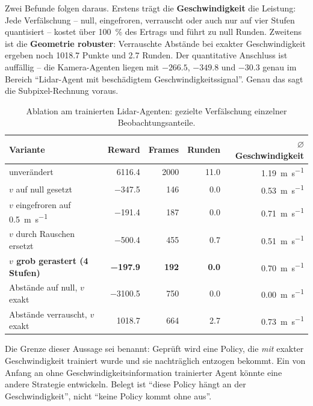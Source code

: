 Zwei Befunde folgen daraus. Erstens trägt die \textbf{Geschwindigkeit} die Leistung: Jede Verfälschung -- null, eingefroren, verrauscht oder auch nur auf vier Stufen quantisiert -- kostet über \SI{100}{\percent} des Ertrags und führt zu null Runden. Zweitens ist die \textbf{Geometrie robuster}: Verrauschte Abstände bei exakter Geschwindigkeit ergeben noch \num{1018.7} Punkte und \num{2.7} Runden. Der quantitative Anschluss ist auffällig -- die Kamera-Agenten liegen mit $-266.5$, $-349.8$ und $-30.3$ genau im Bereich \enquote{Lidar-Agent mit beschädigtem Geschwindigkeitssignal}. Genau das sagt die Subpixel-Rechnung voraus.

\begin{table}[htbp]
  \centering
  \caption{Ablation am trainierten Lidar-Agenten: gezielte Verfälschung einzelner Beobachtungsanteile.}
  \label{tab:ablation}
  \small
  \begin{tabular}{@{}l r r r r@{}}
    \toprule
    \textbf{Variante} & \textbf{Reward} & \textbf{Frames} & \textbf{Runden} & \textbf{$\varnothing$ Geschwindigkeit} \\
    \midrule
    unverändert                          & \num{6116.4}  & \num{2000} & \num{11.0} & \SI{1.19}{\meter\per\second} \\
    $v$ auf null gesetzt                 & \num{-347.5}  & \num{146}  & \num{0.0}  & \SI{0.53}{\meter\per\second} \\
    $v$ eingefroren auf \SI{0.5}{\meter\per\second} & \num{-191.4} & \num{187} & \num{0.0} & \SI{0.71}{\meter\per\second} \\
    $v$ durch Rauschen ersetzt           & \num{-500.4}  & \num{455}  & \num{0.7}  & \SI{0.51}{\meter\per\second} \\
    \textbf{$v$ grob gerastert (4 Stufen)} & \textbf{\num{-197.9}} & \textbf{\num{192}} & \textbf{\num{0.0}} & \SI{0.70}{\meter\per\second} \\
    Abstände auf null, $v$ exakt         & \num{-3100.5} & \num{750}  & \num{0.0}  & \SI{0.00}{\meter\per\second} \\
    Abstände verrauscht, $v$ exakt       & \num{1018.7}  & \num{664}  & \num{2.7}  & \SI{0.73}{\meter\per\second} \\
    \bottomrule
  \end{tabular}
\end{table}


Die Grenze dieser Aussage sei benannt: Geprüft wird eine Policy, die \emph{mit} exakter Geschwindigkeit trainiert wurde und sie nachträglich entzogen bekommt. Ein von Anfang an ohne Geschwindigkeitsinformation trainierter Agent könnte eine andere Strategie entwickeln. Belegt ist \enquote{diese Policy hängt an der Geschwindigkeit}, nicht \enquote{keine Policy kommt ohne aus}.

